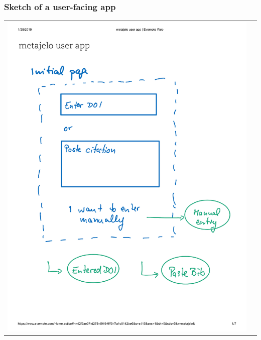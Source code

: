 \begin{frame}
\frametitle{Sketch of a user-facing app}
\begin{tabular}{cc}
\includegraphics[page={1},height=0.7\paperheight]{images/metajelo-user-app-Evernote.pdf}
&

\end{tabular}
\end{frame}
